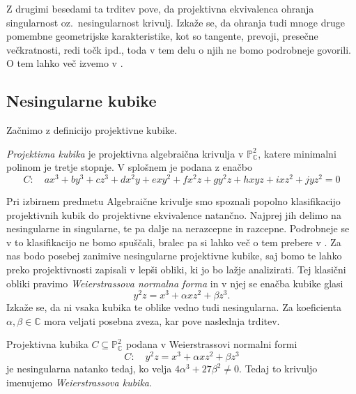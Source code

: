 \documentclass[mat1]{fmfdelo}
\numberwithin{equation}{section}
\newcommand{\C}{\mathbb C}
\newcommand{\PC}{\mathbb{P}^2_\C}
\newcommand{\oz}{oz.\ }
\theoremstyle{definition}
\begin{document}
Z drugimi besedami ta trditev pove, da projektivna ekvivalenca ohranja singularnost \oz nesingularnost krivulj. Izkaže se, da ohranja tudi mnoge druge pomembne geometrijske karakteristike, kot so tangente, prevoji, presečne večkratnosti, redi točk ipd., toda v tem delu o njih ne bomo podrobneje govorili. O tem lahko več izvemo v \cite{Gibson}.


\subsection{Nesingularne kubike}\label{nesingularne kubike}
Začnimo z definicijo projektivne kubike. 

\begin{definicija}
    \emph{Projektivna kubika} je projektivna algebraična krivulja v $\PC$, katere minimalni polinom je tretje stopnje. 
    V splošnem je podana z enačbo
    \[
        C: \quad ax^3 + by^3 + cz^3 + dx^2y + exy^2 + fx^2z + gy^2z + hxyz + ixz^2 + jyz^2 = 0
    \]
\end{definicija}

Pri izbirnem predmetu Algebraične krivulje smo spoznali popolno klasifikacijo projektivnih kubik do projektivne ekvivalence natančno. Najprej jih delimo na nesingularne in singularne, te pa dalje na nerazcepne in razcepne. Podrobneje se v to klasifikacijo ne bomo spuščali, bralec pa si lahko več o tem prebere v \cite[poglavje 15]{Gibson}.
Za nas bodo posebej zanimive nesingularne projektivne kubike, saj bomo te lahko preko projektivnosti zapisali v lepši obliki, ki jo bo lažje analizirati. Tej klasični obliki pravimo \emph{Weierstrassova normalna forma} in v njej se enačba kubike glasi 
\begin{equation}
    \label{klasicna wnf}
    y^2z = x^3 + \alpha xz^2 + \beta z^3. 
\end{equation}
Izkaže se, da ni vsaka kubika te oblike vedno tudi nesingularna. Za koeficienta $\alpha, \beta \in \C$ mora veljati posebna zveza, kar pove naslednja trditev.

\begin{trditev}
    \label{kriterij za singularnost wnf}
    Projektivna kubika $C \subseteq \PC$ podana v Weierstrassovi normalni formi
    \[
        C: \quad y^2z = x^3 + \alpha xz^2 + \beta z^3
    \]
    je nesingularna natanko tedaj, ko velja $4\alpha^3 + 27\beta^2 \neq 0$. Tedaj to krivuljo imenujemo \emph{Weierstrassova kubika}. 

\end{trditev}
\end{document}
